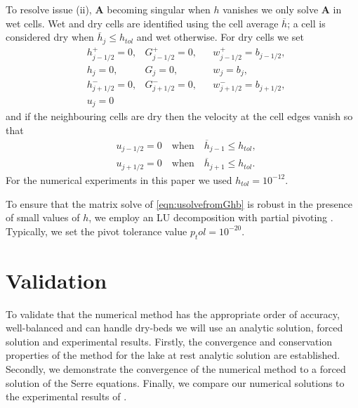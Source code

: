 \documentclass[AMA,STIX1COL]{WileyNJD-v2}
\newcommand{\matr}[1]{\mathbf{#1}}
\begin{document}
To resolve issue (ii), $\matr{A}$ becoming singular when $h$ vanishes we only solve $\matr{A}$ in wet cells. Wet and dry cells are identified using the cell average $\overline{h}$; a cell is considered dry when $\overline{h}_j \le h_{tol}$ and wet otherwise. For dry cells we set
\begin{align*}
& 	h^+_{j-1/2}  = 0,   & 	G^+_{j-1/2}  = 0, & & 	w^+_{j-1/2}  = b_{j-1/2},   \\
&	h_{j} = 0, & 	G_{j}  = 0,  & 	&w_{j}  = b_{j},\\
& 	h^-_{j+1/2}  = 0,  & 	G^-_{j+1/2}  = 0, & 	&w^-_{j+1/2}  = b_{j+1/2}, \\
& u_j = 0
\end{align*}
and if the neighbouring cells are dry then the velocity at the cell edges vanish so that
\begin{align*}
& 	u_{j-1/2}  = 0  \quad \text{when} \quad\overline{h}_{j-1}\le h_{tol}, \\
& 	u_{j+1/2}  = 0  \quad\text{when}\quad\overline{h}_{j+1} \le h_{tol}.
\end{align*}
For the numerical experiments in this paper we used $h_{tol} = 10^{-12}$.

To ensure that the matrix solve of \eqref{eqn:usolvefromGhb} is robust in the presence of small values of $h$, we employ an LU decomposition with partial pivoting \cite{NumRecC-1996}. Typically, we set the pivot tolerance value $p_tol=10^{-20}$. 


\section{Validation}
To validate that the numerical method has the appropriate order of accuracy, well-balanced and can handle dry-beds we will use an analytic solution, forced solution and experimental results. Firstly, the convergence and conservation properties of the method for the lake at rest analytic solution are established. Secondly, we demonstrate the convergence of the numerical method to a forced solution of the Serre equations. Finally, we compare our numerical solutions to the experimental results of \citet{Synolakis-1987-523}.
\end{document}
